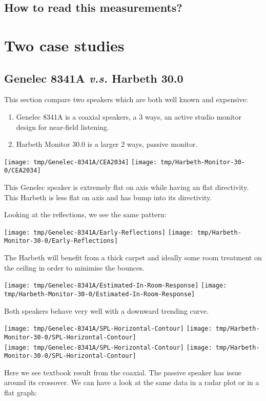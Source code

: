 \documentclass{tufte-book}
\begin{document}
\section{How to read this measurements?}

\chapter{Two case studies}

\section{Genelec 8341A \emph{v.s.} Harbeth 30.0}

This section compare two speakers which are both well known and expensive:
\begin{enumerate}
\item Genelec 8341A is a coaxial speakers, a 3 ways, an active studio monitor design for near-field listening.
\item Harbeth Monitor 30.0 is a larger 2 ways, passive monitor.
\end{enumerate}

\begin{figure*}[ht]
  \texttt{[image: tmp/Genelec-8341A/CEA2034]}
  \texttt{[image: tmp/Harbeth-Monitor-30-0/CEA2034]}
\end{figure*}
This Genelec speaker is extremely flat on axis while having an flat directivity.
This Harbeth is less flat on axis and has bump into its directivity.

Looking at the reflections, we see the same pattern:
\begin{figure*}[ht]
  \texttt{[image: tmp/Genelec-8341A/Early-Reflections]}
  \texttt{[image: tmp/Harbeth-Monitor-30-0/Early-Reflections]}
\end{figure*}
The Harbeth will benefit from a thick carpet and ideally some room treatment on
the ceiling in order to minimise the bounces.

\begin{figure*}[ht]
  \texttt{[image: tmp/Genelec-8341A/Estimated-In-Room-Response]}
  \texttt{[image: tmp/Harbeth-Monitor-30-0/Estimated-In-Room-Response]}
\end{figure*}
Both speakers behave very well with a downward trending curve. 

\begin{figure*}[ht]
  \texttt{[image: tmp/Genelec-8341A/SPL-Horizontal-Contour]}
  \texttt{[image: tmp/Harbeth-Monitor-30-0/SPL-Horizontal-Contour]}
  \\\vspace{\baselineskip}
  \texttt{[image: tmp/Genelec-8341A/SPL-Horizontal-Contour]}
  \texttt{[image: tmp/Harbeth-Monitor-30-0/SPL-Horizontal-Contour]}
\end{figure*}
Here we see textbook result from the coaxial. The passive speaker has issue around its crossover.
We can have a look at the same data in a radar plot or in a flat graph:
\end{document}
